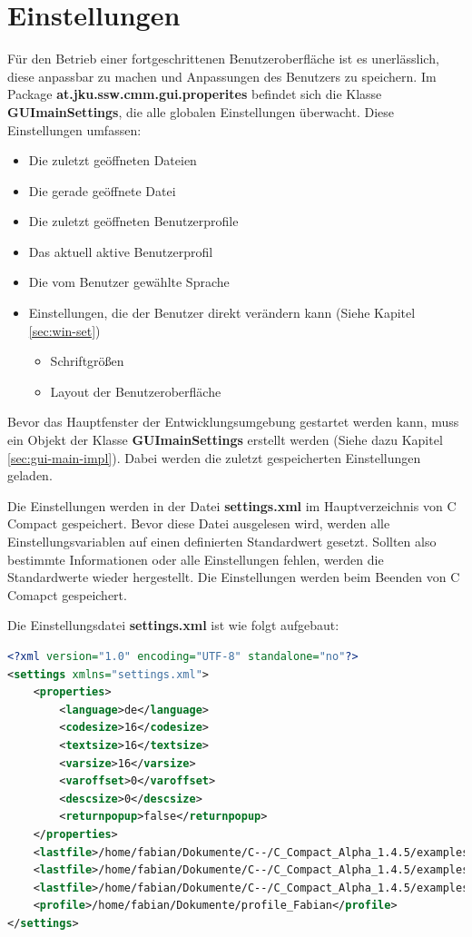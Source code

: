 \section{Einstellungen}
\label{sec:guimainsettings}
Für den Betrieb einer fortgeschrittenen Benutzeroberfläche ist es unerlässlich, diese anpassbar zu machen und Anpassungen des Benutzers zu speichern. Im Package \textbf{at.jku.ssw.cmm.gui.properites} befindet sich die Klasse \textbf{GUImainSettings}, die alle globalen Einstellungen überwacht. Diese Einstellungen umfassen:
\begin{itemize}
\item Die zuletzt geöffneten Dateien
\item Die gerade geöffnete Datei
\item Die zuletzt geöffneten Benutzerprofile
\item Das aktuell aktive Benutzerprofil
\item Die vom Benutzer gewählte Sprache
\item Einstellungen, die der Benutzer direkt verändern kann (Siehe Kapitel \ref{sec:win-set})
\begin{itemize}
\item Schriftgrößen
\item Layout der Benutzeroberfläche
\end{itemize}
\end{itemize}

Bevor das Hauptfenster der Entwicklungsumgebung gestartet werden kann, muss ein Objekt der Klasse \textbf{GUImainSettings} erstellt werden (Siehe dazu Kapitel \ref{sec:gui-main-impl}). Dabei werden die zuletzt gespeicherten Einstellungen geladen.

Die Einstellungen werden in der Datei \textbf{settings.xml} im Hauptverzeichnis von C Compact gespeichert. Bevor diese Datei ausgelesen wird, werden alle Einstellungsvariablen auf einen definierten Standardwert gesetzt. Sollten also bestimmte Informationen oder alle Einstellungen fehlen, werden die Standardwerte wieder hergestellt. Die Einstellungen werden beim Beenden von C Comapct gespeichert.

Die Einstellungsdatei \textbf{settings.xml} ist wie folgt aufgebaut:
\begin{lstlisting}[language=XML]
<?xml version="1.0" encoding="UTF-8" standalone="no"?>
<settings xmlns="settings.xml">
	<properties>
		<language>de</language>
		<codesize>16</codesize>
		<textsize>16</textsize>
		<varsize>16</varsize>
		<varoffset>0</varoffset>
		<descsize>0</descsize>
		<returnpopup>false</returnpopup>
	</properties>
	<lastfile>/home/fabian/Dokumente/C--/C_Compact_Alpha_1.4.5/examples/helloworld/helloworld.cmm</lastfile>
	<lastfile>/home/fabian/Dokumente/C--/C_Compact_Alpha_1.4.5/examples/random/random.cmm</lastfile>
	<lastfile>/home/fabian/Dokumente/C--/C_Compact_Alpha_1.4.5/examples/bubblesort/bubblesort.cmm</lastfile>
	<profile>/home/fabian/Dokumente/profile_Fabian</profile>
</settings>
\end{lstlisting}

